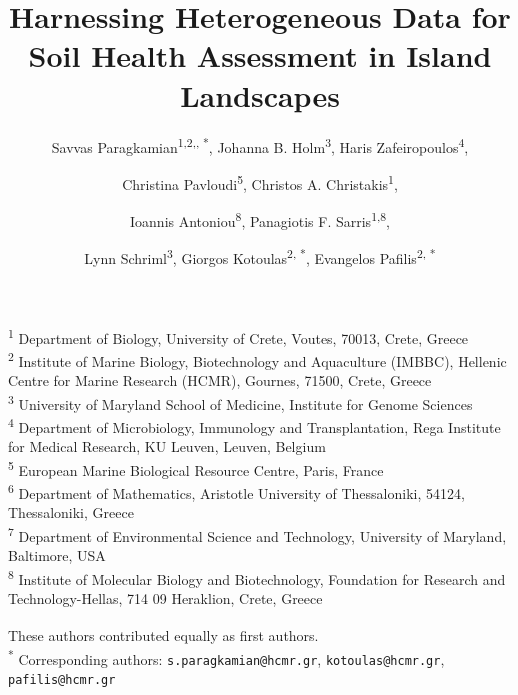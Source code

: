 \documentclass[a4paper,12pt]{article}
\title{Harnessing Heterogeneous Data for Soil Health Assessment in Island Landscapes}
\author{
Savvas Paragkamian\textsuperscript{1,2,\dag, *},
Johanna B. Holm\textsuperscript{3\dag},
Haris Zafeiropoulos\textsuperscript{4}, \and
Christina Pavloudi\textsuperscript{5},
Christos A. Christakis\textsuperscript{1}, \and
Ioannis Antoniou\textsuperscript{8},
Panagiotis F. Sarris\textsuperscript{1,8}, \and
Lynn Schriml\textsuperscript{3},
Giorgos Kotoulas\textsuperscript{2, *},
Evangelos Pafilis\textsuperscript{2, *}
}
\begin{document}
\maketitle

\begin{center}
\textsuperscript{1} Department of Biology, University of Crete, Voutes, 70013, Crete, Greece \\
\textsuperscript{2} Institute of Marine Biology, Biotechnology and Aquaculture (IMBBC), Hellenic Centre for Marine Research (HCMR), Gournes, 71500, Crete, Greece \\
\textsuperscript{3} University of Maryland School of Medicine, Institute for Genome Sciences \\
\textsuperscript{4} Department of Microbiology, Immunology and Transplantation, Rega Institute for Medical Research, KU Leuven, Leuven, Belgium \\
\textsuperscript{5} European Marine Biological Resource Centre, Paris, France \\
\textsuperscript{6} Department of Mathematics, Aristotle University of Thessaloniki, 54124, Thessaloniki, Greece \\
\textsuperscript{7} Department of Environmental Science and Technology, University of Maryland, Baltimore, USA \\
\textsuperscript{8} Institute of Molecular Biology and Biotechnology, Foundation for Research and Technology-Hellas, 714 09 Heraklion, Crete, Greece
\end{center}
\vspace{1em}

\noindent\textsuperscript{\dag} These authors contributed equally as first authors. \\
\noindent\textsuperscript{*} Corresponding authors: \texttt{s.paragkamian@hcmr.gr}, \texttt{kotoulas@hcmr.gr}, \texttt{pafilis@hcmr.gr}
\end{document}
